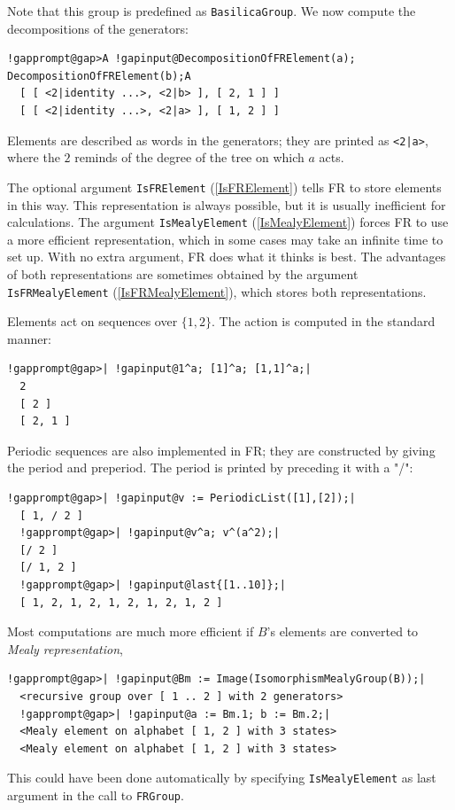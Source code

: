 \documentclass[a4paper,11pt]{report}
\begin{document}
{{ Note that this group is predefined as \texttt{BasilicaGroup}. We now compute the decompositions of the generators: 
\begin{Verbatim}[commandchars=!@A,fontsize=\small,frame=single,label=Example]
  !gapprompt@gap>A !gapinput@DecompositionOfFRElement(a); DecompositionOfFRElement(b);A
  [ [ <2|identity ...>, <2|b> ], [ 2, 1 ] ]
  [ [ <2|identity ...>, <2|a> ], [ 1, 2 ] ]
\end{Verbatim}
 Elements are described as words in the generators; they are printed as \texttt{{\textless}2|a{\textgreater}}, where the $2$ reminds of the degree of the tree on which $a$ acts. 

 The optional argument \texttt{IsFRElement} (\ref{IsFRElement}) tells \textsf{FR} to store elements in this way. This representation is always possible, but it
is usually inefficient for calculations. The argument \texttt{IsMealyElement} (\ref{IsMealyElement}) forces \textsf{FR} to use a more efficient representation, which in some cases may take an
infinite time to set up. With no extra argument, \textsf{FR} does what it thinks is best. The advantages of both representations are
sometimes obtained by the argument \texttt{IsFRMealyElement} (\ref{IsFRMealyElement}), which stores both representations. 

 Elements act on sequences over $\{1,2\}$. The action is computed in the standard manner: 
\begin{Verbatim}[commandchars=!@|,fontsize=\small,frame=single,label=Example]
  !gapprompt@gap>| !gapinput@1^a; [1]^a; [1,1]^a;|
  2
  [ 2 ]
  [ 2, 1 ]
\end{Verbatim}
 Periodic sequences are also implemented in \textsf{FR}; they are constructed by giving the period and preperiod. The period is
printed by preceding it with a "/": 
\begin{Verbatim}[commandchars=!@|,fontsize=\small,frame=single,label=Example]
  !gapprompt@gap>| !gapinput@v := PeriodicList([1],[2]);|
  [ 1, / 2 ]
  !gapprompt@gap>| !gapinput@v^a; v^(a^2);|
  [/ 2 ]
  [/ 1, 2 ]
  !gapprompt@gap>| !gapinput@last{[1..10]};|
  [ 1, 2, 1, 2, 1, 2, 1, 2, 1, 2 ]
\end{Verbatim}
 

 Most computations are much more efficient if $B$'s elements are converted to \emph{Mealy representation}, 
\begin{Verbatim}[commandchars=!@|,fontsize=\small,frame=single,label=Example]
  !gapprompt@gap>| !gapinput@Bm := Image(IsomorphismMealyGroup(B));|
  <recursive group over [ 1 .. 2 ] with 2 generators>
  !gapprompt@gap>| !gapinput@a := Bm.1; b := Bm.2;|
  <Mealy element on alphabet [ 1, 2 ] with 3 states>
  <Mealy element on alphabet [ 1, 2 ] with 3 states>
\end{Verbatim}
 This could have been done automatically by specifying \texttt{IsMealyElement} as last argument in the call to \texttt{FRGroup}. 

}}
\end{document}
